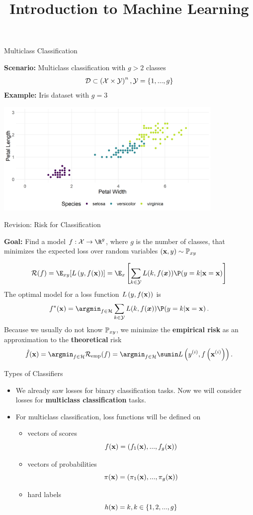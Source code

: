\documentclass[11pt,compress,t,notes=noshow, xcolor=table]{beamer}
\title{Introduction to Machine Learning}
\date{}
\begin{document}


\sloppy 

\begin{vbframe}{Multiclass Classification}

\textbf{Scenario:} Multiclass classification with $g > 2$ classes
$$\mathcal{D} \subset \left(\mathcal{X} \times \mathcal{Y}\right)^n, \mathcal{Y} = \{1, ..., g\}$$ 
\textbf{Example:} Iris dataset with $g = 3$

\vspace*{0.1cm}
\begin{center}
\includegraphics[width = 11cm ]{figure/iris_scatter.png}
\end{center}

\end{vbframe}

\begin{vbframe}{Revision: Risk for Classification}

\textbf{Goal:} Find a model  $f: \Xspace \to \R^g$, where $g$ is the number of classes, that minimizes the expected loss over random variables $(\mathbf{x}, y) \sim \mathbb{P}_{xy}$ 

$$
 \riskf = \E_{xy}[\Lxy] = \E_{x}\left[\sum_{k \in \Yspace} L(k, f(\bm{x})) \P(y = k| \xv = \xv)\right] 
$$
The optimal model for a loss function $L\left(y, f(\mathbf{x})\right)$ is
$$
  \fxbayes = \argmin_{f \in \Hspace} \sum_{k \in \Yspace} L(k, f(\bm{x})) \P(y = k| \xv = \xv)\,. $$
Because we usually do not know $\mathbb{P}_{xy}$, we minimize the \textbf{empirical risk} as an approximation to the \textbf{theoretical} risk
$$
\fxh = \argmin_{f \in \Hspace} \riske(f) = \argmin_{f \in \Hspace} \sumin \Lxyi.
$$
\end{vbframe}


\begin{vbframe}{Types of Classifiers}
\begin{itemize}
  \item We already saw losses for binary classification tasks. 
  Now we will consider losses for \textbf{multiclass classification} tasks.
  \lz
  \item For multiclass classification, loss functions will be defined on
  \begin{itemize}
    \item vectors of scores $$f(\mathbf{x}) = \left(f_1(\mathbf{x}), ..., f_g(\mathbf{x})\right)$$
    \item vectors of probabilities $$\pi(\mathbf{x}) = \left(\pi_1(\mathbf{x}), ..., \pi_g(\mathbf{x})\right)$$
    \item hard labels $$h(\mathbf{x}) = k, k \in \{1, 2, ..., g\}$$
\end{itemize}
\end{itemize}
\end{vbframe}
\end{document}

